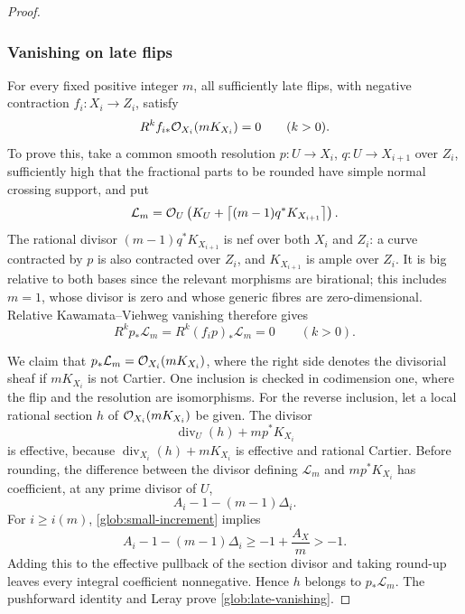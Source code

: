 \begin{proof}
\subsubsection*{Vanishing on late flips}
For every fixed positive integer $m$, all sufficiently late flips, with
negative contraction $f_i:X_i\to Z_i$, satisfy
\begin{equation}\label{glob:late-vanishing}
 R^k f_{i*}\mathcal O_{X_i}(mK_{X_i})=0\qquad(k>0).
\end{equation}
To prove this, take a common smooth resolution
$p:U\to X_i$, $q:U\to X_{i+1}$ over $Z_i$, sufficiently high that the
fractional parts to be rounded have simple normal crossing support, and
put
\[
 \mathcal L_m=\mathcal O_U\left(K_U+\left\lceil
                    (m-1)q^*K_{X_{i+1}}\right\rceil\right).
\]
The rational divisor $(m-1)q^*K_{X_{i+1}}$ is nef over both $X_i$ and
$Z_i$: a curve contracted by $p$ is also contracted over $Z_i$, and
$K_{X_{i+1}}$ is ample over $Z_i$.  It is big relative to both bases since
the relevant morphisms are birational; this includes $m=1$, whose divisor
is zero and whose generic fibres are zero-dimensional.  Relative
Kawamata--Viehweg vanishing \cite{KM98} therefore gives
\[
 R^kp_*\mathcal L_m=R^k(f_ip)_*\mathcal L_m=0\qquad(k>0).
\]

We claim that $p_*\mathcal L_m=\mathcal O_{X_i}(mK_{X_i})$, where the right side
denotes the divisorial sheaf if $mK_{X_i}$ is not Cartier.  One inclusion
is checked in codimension one, where the flip and the resolution are
isomorphisms.  For the reverse inclusion, let a local rational section
$h$ of $\mathcal O_{X_i}(mK_{X_i})$ be given.  The divisor
\[
 \operatorname{div}_U(h)+mp^*K_{X_i}
\]
is effective, because $\operatorname{div}_{X_i}(h)+mK_{X_i}$ is effective
and rational Cartier.  Before rounding, the difference between the
divisor defining $\mathcal L_m$ and $mp^*K_{X_i}$ has coefficient, at any
prime divisor of $U$,
\[
 A_i-1-(m-1)\Delta_i.
\]
For $i\geq i(m)$, \eqref{glob:small-increment} implies
\begin{equation}\label{glob:rounding-strict}
 A_i-1-(m-1)\Delta_i
 \geq -1+\frac{A_X}{m}>-1.
\end{equation}
Adding this to the effective pullback of the section divisor and taking
round-up leaves every integral coefficient nonnegative.  Hence $h$
belongs to $p_*\mathcal L_m$.  The pushforward identity and Leray prove
\eqref{glob:late-vanishing}.


\end{proof}
